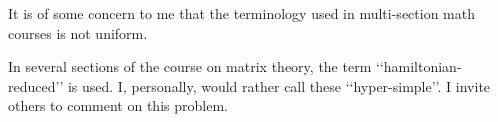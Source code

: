 \documentclass{sample}
\begin{document}
It is of some concern to me that
the terminology used in multi-section
math courses is not uniform.

In several sections of the course on
matrix theory, the term
‘‘hamiltonian-reduced’’ is used.
I, personally, would rather call these
‘‘hyper-simple’’. I invite others
to comment on this problem.
\end{document}
